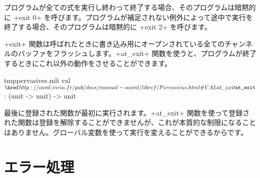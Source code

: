 プログラムが全ての式を実行し終わって終了する場合、そのプログラムは暗黙的に \ml+exit 0+ を呼びます。プログラムが補足されない例外によって途中で実行を終了する場合、そのプログラムは暗黙的に \ml+exit 2+ を呼びます。

\ml+exit+ 関数は呼ばれたときに書き込み用にオープンされている全てのチャンネルのバッファをフラッシュします。\ml+at_exit+ 関数を使うと、プログラムが終了するときにこれ以外の動作をさせることができます。
%
\begin{listingcodefile}{tmppervasives.mli}
val $\indexlibvalue{Pervasives}{at\_exit}$ : (unit -> unit) -> unit
\end{listingcodefile}
%
最後に登録された関数が最初に実行されます。\ml+at_exit+ 関数を使って登録された関数は登録を解除することができませんが、これが本質的な制限になることはありません。グローバル変数を使って実行を変えることができるからです。

\section{エラー処理}

